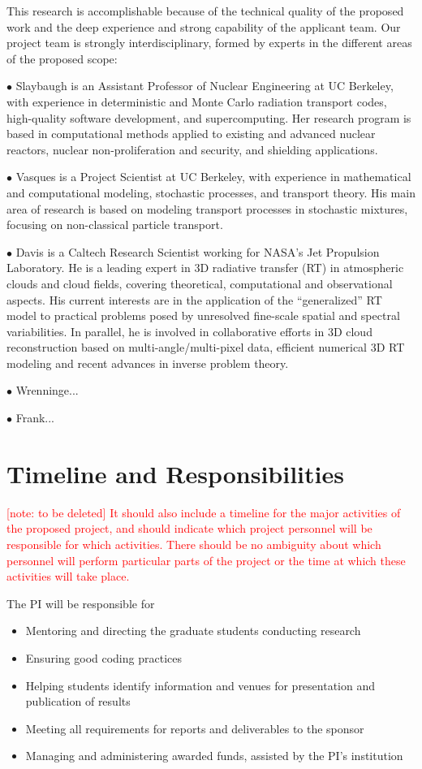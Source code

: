 \documentclass[12pt]{article}
\begin{document}
This research is accomplishable because of the technical quality of the proposed work and the deep experience and strong capability of the applicant team.
Our project team is strongly interdisciplinary, formed by experts in the different areas of the proposed scope:

$\bullet$ Slaybaugh is an Assistant Professor of Nuclear Engineering at UC Berkeley, with experience in deterministic and Monte Carlo radiation transport codes, high-quality software development, and supercomputing.
Her research program is based in computational methods applied to existing and advanced nuclear reactors, nuclear non-proliferation and security, and shielding applications.

$\bullet$ Vasques is a Project Scientist at UC Berkeley, with experience in mathematical and computational modeling, stochastic processes, and transport theory.
His main area of research is based on modeling transport processes in stochastic mixtures, focusing on non-classical particle transport.

$\bullet$ Davis is a Caltech Research Scientist working for NASA's Jet Propulsion Laboratory.  He is a leading expert in 3D radiative transfer (RT) in atmospheric clouds and cloud fields, covering theoretical, computational and observational aspects.
His current interests are in the application of the ``generalized'' RT model to practical problems posed by unresolved fine-scale spatial and spectral variabilities.  In parallel, he is involved in collaborative efforts in 3D cloud reconstruction based on multi-angle/multi-pixel data, efficient numerical 3D RT modeling and recent advances in inverse problem theory.

$\bullet$ Wrenninge...

$\bullet$ Frank...


\section{Timeline and Responsibilities}

\textcolor{red}{[note: to be deleted] It should also include a timeline for the major activities of the proposed
project, and should indicate which project personnel will be responsible for which activities.
There should be no ambiguity about which personnel will perform particular parts of the project or the time at which these activities will take place.}

The PI will be responsible for
\begin{itemize}[noitemsep]
\item Mentoring and directing the graduate students conducting research
\item Ensuring good coding practices
\item Helping students identify information and venues for presentation and publication of results
\item Meeting all requirements for reports and deliverables to the sponsor
\item Managing and administering awarded funds, assisted by the PI's institution
\end{itemize}
\end{document}
